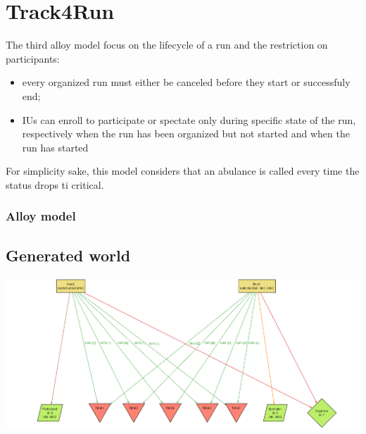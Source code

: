 \section{Track4Run}
The third alloy model focus on the lifecycle of a run and the restriction on participants:
\begin{itemize}
\item every organized run must either be canceled before they start or successfuly end;
\item IUs can enroll to participate or spectate only during specific state of the run, respectively when the run has been organized but not started and when the run has started
\end{itemize}
For simplicity sake, this model considers that an abulance is called every time the status drops ti critical.
\subsubsection{Alloy model}

\subsection{Generated world}
\includegraphics[width = 0.8\textheight, angle=90]{sections/alloy/GenWorldT4R.png}
